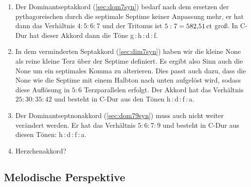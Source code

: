 \begin{enumerate}
  \item Der Dominantseptakkord (\cref{sec:dom7syn}) bedarf nach dem ersetzen der pythagoreischen durch die septimale Septime keiner Anpassung mehr, er hat dann das Verhältnis $4:5:6:7$ und der Tritonus ist $5:7 = 582{,}51\,\text{ct}$ groß. In C-Dur hat dieser Akkord dann die Töne g\,:\,\naturalm h\,:\,d\,:\,\septimal f.
  \item In dem verminderten Septakkord (\cref{sec:dim7syn}) haben wir die kleine None als reine kleine Terz über der Septime definiert. Es ergibt also Sinn auch die None um ein septimales Komma zu alterieren. Dies passt auch dazu, dass die None wie die Septime mit einem Halbton nach unten aufgelöst wird, sodass diese Auflösung in $5:6$ Terzparallelen erfolgt. Der Akkord hat das Verhältnis $25:30:35:42$ und besteht in C-Dur aus den Tönen \naturalm h\,:\,d\,:\,\septimal f\,:\,\septimal\flatp a.
  \item Der Dominantseptnonakkord (\cref{sec:dom79syn}) muss auch nicht weiter verändert werden. Er hat das Verhältnis $5:6:7:9$ und besteht in C-Dur aus diesen Tönen: \naturalm h\,:\,d\,:\,\septimal f\,:\,a.
  \item Herzchenakkord?
\end{enumerate}

\subsection{Melodische Perspektive}

